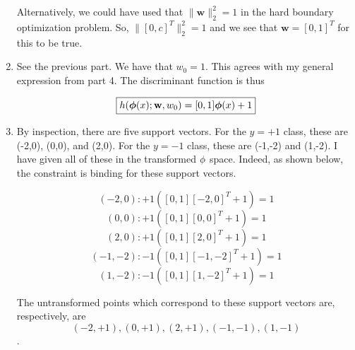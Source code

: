 \documentclass[submit]{harvardml}
\begin{document}
\begin{enumerate}
    Alternatively, we could have used that $\|\mathbf{w}\|_2^2 = 1$ in the hard boundary optimization problem. So, $\|[0,c]^T\|_2^2 = 1$ and we see that $\mathbf{w} = [0,1]^T$ for this to be true.
    
    \item See the previous part. We have that $\boxed{w_0 = 1}$. This agrees with my general expression from part 4. The discriminant function is thus
    
    $$\boxed{h(\boldsymbol{\phi}(x);\mathbf{w},w_0)= [0,1] \boldsymbol{\phi}(x) + 1 }$$ 
    
    \item By inspection, there are five support vectors. For the $y = +1$ class, these are (-2,0), (0,0), and (2,0). For the $y = -1$ class, these are (-1,-2) and (1,-2). I have given all of these in the transformed $\bold\phi$ space. Indeed, as shown below, the constraint is binding for these support vectors.
    
    $$ (-2,0): +1([0,1][-2,0]^T + 1) = 1$$
    $$ (0,0): +1([0,1][0,0]^T + 1) = 1$$
    $$ (2,0): +1([0,1][2,0]^T + 1) = 1$$
    $$ (-1,-2): -1([0,1][-1,-2]^T + 1) = 1$$
    $$ (1,-2): -1([0,1][1,-2]^T + 1) = 1$$
    
    The untransformed points which correspond to these support vectors are, respectively, are $$(-2,+1),  (0,+1), (2,+1), (-1,-1), (1,-1) $$.
    
\end{enumerate}

\newpage
\end{document}
